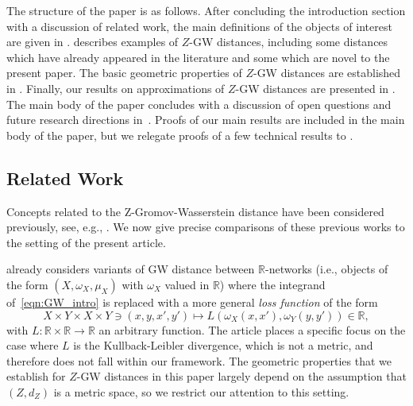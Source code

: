 \documentclass[twoside,11pt]{article}
\theoremstyle{definition}
\newcommand{\R}{\mathbb{R}}
\begin{document}
The structure of the paper is as follows. After concluding the introduction section with a discussion of related work, the main definitions of the objects of interest are given in .  describes examples of $Z$-GW distances, including some distances which have already appeared in the literature and some which are novel to the present paper. The basic geometric properties of $Z$-GW distances are established in . Finally, our results on approximations of $Z$-GW distances are presented in . The main body of the paper concludes with a discussion of open questions and future research directions in~. Proofs of our main results are included in the main body of the paper, but we relegate proofs of a few technical results to .

\subsection{Related Work}\label{sec:related_work}
 Concepts related to the Z-Gromov-Wasserstein distance have been considered previously, see, e.g., \citep{jain2009structure,peyre2016gromov,yang2023exploiting,kawano2024multi}. We now give precise comparisons of these previous works to the setting of the present article.

 \citet{peyre2016gromov} already considers variants of GW distance between $\R$-networks (i.e., objects of the form $(X,\omega_X,\mu_X)$ with $\omega_X$ valued in $\R$) where the integrand of~\eqref{eqn:GW_intro} is replaced with a more general \emph{loss function} of the form 
 \[
 X \times Y \times X \times Y \ni (x,y,x',y') \mapsto L(\omega_X(x,x'),\omega_Y(y,y')) \in \R,
 \]
 with $L: \R \times \R \to \R$ an arbitrary function. The article places a specific focus on the case where $L$ is the Kullback-Leibler divergence, which is not a metric, and therefore does not fall within our framework. The geometric properties that we establish for $Z$-GW distances in this paper largely depend on the assumption that $(Z,d_Z)$ is a metric space, so we restrict our attention to this setting.
\end{document}
